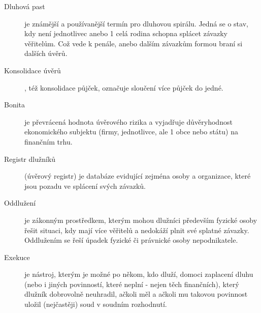 \begin{description}
    \item[Dluhová past] je známější a používanější termín pro dluhovou spirálu. Jedná se o stav, kdy není jednotlivec anebo 1 celá rodina schopna splácet závazky věřitelům. Což vede k penále, anebo dalším závazkům formou braní si dalších úvěrů.
    \item[Konsolidace úvěrů], též konsolidace půjček, označuje sloučení více půjček do jedné.
    \item[Bonita] je převrácená hodnota úvěrového rizika a vyjadřuje důvěryhodnost ekonomického subjektu (firmy, jednotlivce, ale 1 obce nebo státu) na finančním trhu.
    \item[Registr dlužníků] (úvěrový registr) je databáze evidující zejména osoby a organizace, které jsou pozadu ve splácení svých závazků.
    \item[Oddlužení] je zákonným prostředkem, kterým mohou dlužníci především fyzické osoby řešit situaci, kdy mají více věřitelů a nedokáží plnit své splatné závazky. Oddlužením se řeší úpadek fyzické či právnické osoby nepodnikatele.
    \item[Exekuce] je nástroj, kterým je možné po někom, kdo dluží, domoci zaplacení dluhu (nebo i jiných povinností, které neplní - nejen těch finančních), který dlužník dobrovolně neuhradil, ačkoli měl a ačkoli mu takovou povinnost uložil (nejčastěji) soud v soudním rozhodnutí.
\end{description}


